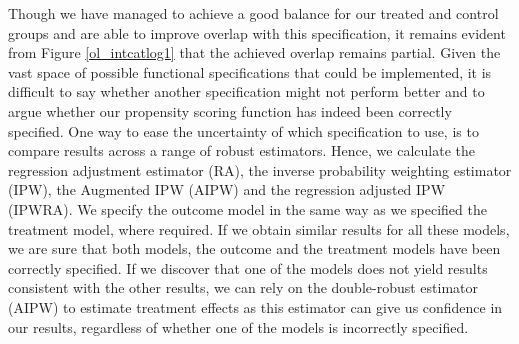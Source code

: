 Though we have managed to achieve a good balance for our treated and control groups and are able to improve overlap with this specification, it remains evident from Figure \ref{ol_intcatlog1} that the achieved overlap remains partial. Given the vast space of possible functional specifications that could be implemented, it is difficult to say whether another specification might not perform better and to argue whether our propensity scoring function has indeed been correctly specified. One way to ease the uncertainty of which specification to use, is to compare results across a range of robust estimators. Hence, we calculate the regression adjustment estimator (RA), the inverse probability weighting estimator (IPW), the Augmented IPW (AIPW) and the regression adjusted IPW (IPWRA). We specify the outcome model in the same way as we specified the treatment model, where required. If we obtain similar results for all these models, we are sure that both models, the outcome and the treatment models have been correctly specified. If we discover that one of the models does not yield results consistent with the other results, we can rely on the double-robust estimator (AIPW) to estimate treatment effects as this estimator can give us confidence in our results, regardless of whether one of the models is incorrectly specified. 
\\ \par

